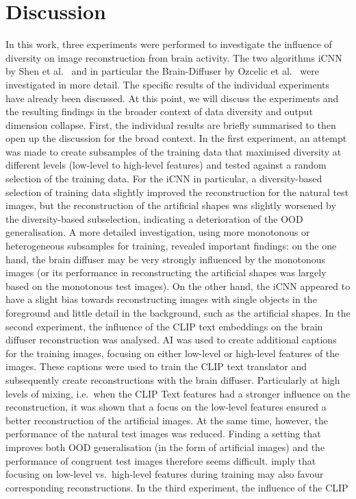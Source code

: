\chapter{Discussion}


In this work, three experiments were performed to investigate the influence of diversity on image reconstruction from brain activity. The two algorithms iCNN by Shen et al.~\cite{shenDeepImageReconstruction2019} and in particular the Brain-Diffuser by Ozcelic et al.~\cite{ozcelikNaturalSceneReconstruction2023} were investigated in more detail. The specific results of the individual experiments have already been discussed. At this point, we will discuss the experiments and the resulting findings in the broader context of data diversity and output dimension collapse. First, the individual results are briefly summarised to then open up the discussion for the broad context. In the first experiment, an attempt was made to create subsamples of the training data that maximised diversity at different levels (low-level to high-level features) and tested against a random selection of the training data. For the iCNN in particular, a diversity-based selection of training data slightly improved the reconstruction for the natural test images, but the reconstruction of the artificial shapes was slightly worsened by the diversity-based subselection, indicating a deterioration of the OOD generalisation. A more detailed investigation, using more monotonous or heterogeneous subsamples for training, revealed important findings: on the one hand, the brain diffuser may be very strongly influenced by the monotonous images (or its performance in reconstructing the artificial shapes was largely based on the monotonous test images). On the other hand, the iCNN appeared to have a slight bias towards reconstructing images with single objects in the foreground and little detail in the background, such as the artificial shapes. In the second experiment, the influence of the CLIP text embeddings on the brain diffuser reconstruction was analysed. AI was used to create additional captions for the training images, focusing on either low-level or high-level features of the images. These captions were used to train the CLIP text translator and subsequently create reconstructions with the brain diffuser. Particularly at high levels of mixing, i.e.\ when the CLIP Text features had a stronger influence on the reconstruction, it was shown that a focus on the low-level features ensured a better reconstruction of the artificial images. At the same time, however, the performance of the natural test images was reduced. Finding a setting that improves both OOD generalisation (in the form of artificial images) and the performance of congruent test images therefore seems difficult.  imply that focusing on low-level vs.\ high-level features during training may also favour corresponding reconstructions. In the third experiment, the influence of the CLIP 